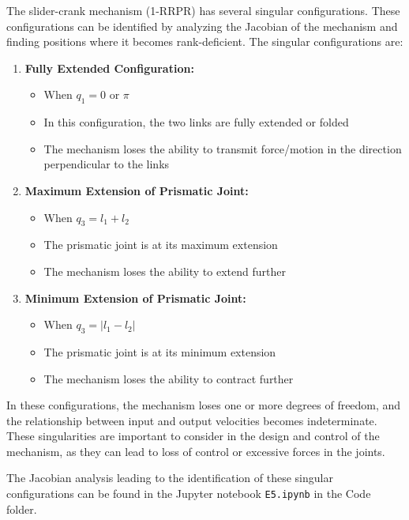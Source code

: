 \begin{solution}
    The slider-crank mechanism (1-RRPR) has several singular configurations. These configurations can be identified by analyzing the Jacobian of the mechanism and finding positions where it becomes rank-deficient. The singular configurations are:

    \begin{enumerate}
        \item \textbf{Fully Extended Configuration:}
        \begin{itemize}
            \item When $q_1 = 0$ or $\pi$
            \item In this configuration, the two links are fully extended or folded
            \item The mechanism loses the ability to transmit force/motion in the direction perpendicular to the links
        \end{itemize}

        \item \textbf{Maximum Extension of Prismatic Joint:}
        \begin{itemize}
            \item When $q_3 = l_1 + l_2$
            \item The prismatic joint is at its maximum extension
            \item The mechanism loses the ability to extend further
        \end{itemize}

        \item \textbf{Minimum Extension of Prismatic Joint:}
        \begin{itemize}
            \item When $q_3 = |l_1 - l_2|$
            \item The prismatic joint is at its minimum extension
            \item The mechanism loses the ability to contract further
        \end{itemize}
    \end{enumerate}

    In these configurations, the mechanism loses one or more degrees of freedom, and the relationship between input and output velocities becomes indeterminate. These singularities are important to consider in the design and control of the mechanism, as they can lead to loss of control or excessive forces in the joints.

    The Jacobian analysis leading to the identification of these singular configurations can be found in the Jupyter notebook \texttt{E5.ipynb} in the Code folder.
\end{solution}

